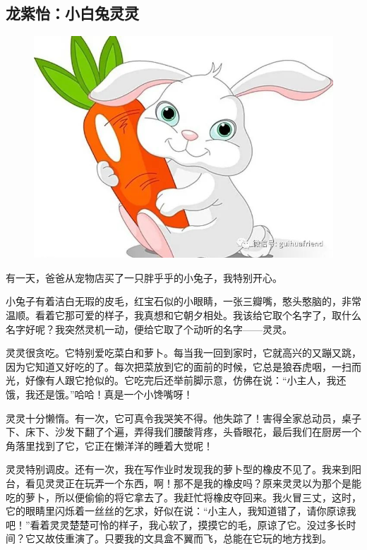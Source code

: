 \vspace{10pt}

{\centering\subsection*{龙紫怡：小白兔灵灵}}


\renewcommand{\leftmark}{龙紫怡：小白兔灵灵}

\begin{figure}[htbp]

\centering

\includegraphics[width = .5\textwidth]{./ch/13.jpg}

\end{figure}





有一天，爸爸从宠物店买了一只胖乎乎的小兔子，我特别开心。

小兔子有着洁白无瑕的皮毛，红宝石似的小眼睛，一张三瓣嘴，憨头憨脑的，非常温顺。看着它那可爱的样子，我真想和它朝夕相处。我该给它取个名字了，取什么名字好呢？我突然灵机一动，便给它取了个动听的名字——灵灵。

灵灵很贪吃。它特别爱吃菜白和萝卜。每当我一回到家时，它就高兴的又蹦又跳，因为它知道又好吃的了。每次把菜放到它的面前的时候，它总是狼吞虎咽，一扫而光，好像有人跟它抢似的。它吃完后还举前脚示意，仿佛在说：“小主人，我还饿，我还是饿。”哈哈！真是一个小馋嘴呀！

灵灵十分懒惰。有一次，它可真令我哭笑不得。他失踪了！害得全家总动员，桌子下、床下、沙发下翻了个遍，弄得我们腰酸背疼，头昏眼花，最后我们在厨房一个角落里找到了它，它正在懒洋洋的睡着大觉呢！

灵灵特别调皮。还有一次，我在写作业时发现我的萝卜型的橡皮不见了。我来到阳台，看见灵灵正在玩弄一个东西，啊！那不是我的橡皮吗？原来灵灵以为那个是能吃的萝卜，所以便偷偷的将它拿去了。我赶忙将橡皮夺回来。我火冒三丈，这时，它的眼睛里闪烁着一丝丝的乞求，好似在说：“小主人，我知道错了，请你原谅我吧！”看着灵灵楚楚可怜的样子，我心软了，摸摸它的毛，原谅了它。没过多长时间？它又故伎重演了。只要我的文具盒不翼而飞，总能在它玩的地方找到。

